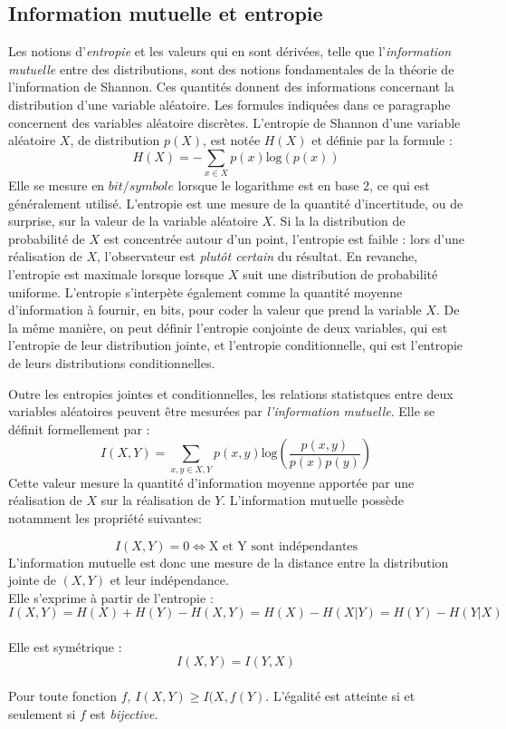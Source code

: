 \subsection{Information mutuelle et entropie}

Les notions d'\emph{entropie} et les valeurs qui en sont dérivées, telle que l'\emph{information mutuelle} entre des distributions, sont des notions fondamentales de la théorie de l'information de Shannon. Ces quantités donnent des informations concernant la distribution d'une variable aléatoire.
Les formules indiquées dans ce paragraphe concernent des variables aléatoire discrètes. 
L'entropie de Shannon d'une variable aléatoire $X$, de distribution $p(X)$, est notée $H(X)$ et définie par la formule : 
$$ H(X) = - \sum_{x \in X}{p(x)\textrm{log}(p(x))}$$
Elle se mesure en $bit/symbole$ lorsque le logarithme est en base 2, ce qui est généralement utilisé. 
L'entropie est une mesure de la quantité d'incertitude, ou de surprise, sur la valeur de la variable aléatoire $X$. Si la la distribution de probabilité de $X$ est concentrée autour d'un point, l'entropie est faible : lors d'une réalisation de $X$, l'observateur est \emph{plutôt certain} du résultat. En revanche, l'entropie est maximale lorsque lorsque $X$ suit une distribution de probabilité uniforme.
L'entropie s'interpète également comme la quantité moyenne d'information à fournir, en bits, pour coder la valeur que prend la variable $X$.
De la même manière, on peut définir l'entropie conjointe de deux variables, qui est l'entropie de leur distribution jointe, et l'entropie conditionnelle, qui est l'entropie de leurs distributions conditionnelles.

Outre les entropies jointes et conditionnelles, les relations statistques entre deux variables aléatoires peuvent être mesurées par \emph{l'information mutuelle}. Elle se définit formellement par : 
$$ I(X,Y) = \sum_{x,y \in X,Y}{p(x,y)\textrm{log}(\frac{p(x,y)}{p(x)p(y)})}$$
Cette valeur mesure la quantité d'information moyenne apportée par une réalisation de $X$ sur la réalisation de $Y$. L'information mutuelle possède notamment les propriété suivantes:

$$I(X,Y) = 0 \Leftrightarrow \textrm{X et Y sont indépendantes}$$
L'information mutuelle est donc une mesure de la distance entre la distribution jointe de $(X,Y)$ et leur indépendance.\\
Elle s'exprime à partir de l'entropie : $$I(X,Y) = H(X) + H(Y) - H(X,Y) = H(X) - H(X|Y) = H(Y) - H(Y|X)$$\\
Elle est symétrique : $$I(X,Y) = I(Y,X)$$\\
Pour toute fonction $f$, $I(X,Y) \geq I(X,f(Y)$. L'égalité est atteinte si et seulement si $f$ est \emph{bijective}.


